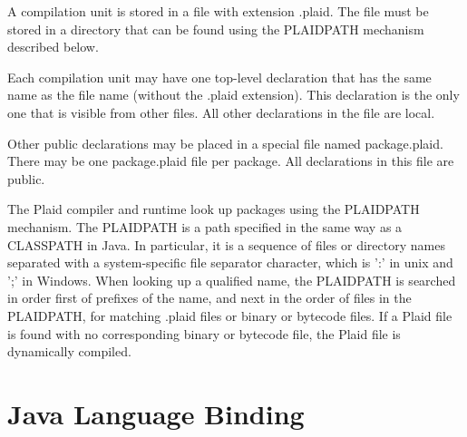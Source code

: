 A compilation unit is stored in a file with extension .plaid.
The file
must be stored in a directory that can be found using the PLAIDPATH
mechanism described below.


Each compilation unit may have one top-level declaration that has the
same name as the file name (without the .plaid extension).  This
declaration is the only one that is visible from other files. All
other declarations in the file are local.

Other public declarations may be placed in a special file named
package.plaid. There may be one package.plaid file per package. All
declarations in this file are public.



The Plaid compiler and runtime look up packages using the PLAIDPATH
mechanism.  The PLAIDPATH is a path specified in the same way as a
CLASSPATH in Java.  In particular, it is a sequence of files or
directory names separated with a system-specific file separator
character, which is ':' in unix and ';' in Windows.  When looking up a
qualified name, the PLAIDPATH is searched in order first of prefixes
of the name, and next in the order of files in the PLAIDPATH, for
matching .plaid files or binary or bytecode files.  If a Plaid file is
found with no corresponding binary or bytecode file, the Plaid file is
dynamically compiled.






\section{Java Language Binding}

